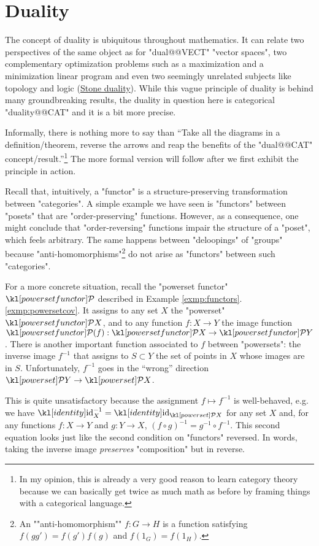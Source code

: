 \documentclass[main.tex]{subfiles}
\begin{document}
\chapter{Duality}\label{chap:duality}
The concept of duality is ubiquitous throughout mathematics. It can relate two perspectives of the same object as for "dual@@VECT" "vector spaces", two complementary optimization problems such as a maximization and a minimization linear program and even two seemingly unrelated subjects like topology and logic (\href{https://en.wikipedia.org/wiki/Stone_duality}{Stone duality}). While this vague principle of duality is behind many groundbreaking results, the duality in question here is categorical "duality@@CAT" and it is a bit more precise.%

Informally, there is nothing more to say than ``Take all the diagrams in a definition/theorem, reverse the arrows and reap the benefits of the "dual@@CAT" concept/result.''\footnote{In my opinion, this is already a very good reason to learn category theory because we can basically get twice as much math as before by framing things with a categorical language.} The more formal version will follow after we first exhibit the principle in action.

Recall that, intuitively, a "functor" is a structure-preserving transformation between "categories". A simple example we have seen is "functors" between "posets" that are "order-preserving" functions. However, as a consequence, one might conclude that "order-reversing" functions impair the structure of a "poset", which feels arbitrary. The same happens between "deloopings" of "groups" because "anti-homomorphisms"\footnote{\AP An ""anti-homomorphism"" $f: G \rightarrow H$ is a function satisfying $f(gg') = f(g')f(g)$ and $f(1_G) = f(1_H)$.} do not arise as "functors" between such "categories".

For a more concrete situation, recall the "powerset functor" $\mPcov$ described in Example \ref{exmp:functors}.\ref{exmp:powersetcov}. It assigns to any set $X$ the "powerset" $\mPcov X$, and to any function $f: X \rightarrow Y$ the image function $\mPcov(f): \mPcov X \rightarrow \mPcov Y$. There is another important function associated to $f$ between "powersets": the inverse image $f^{-1}$ that assigns to $S \subset Y$ the set of points in $X$ whose images are in $S$. Unfortunately, $f^{-1}$ goes in the ``wrong'' direction $\mP Y \rightarrow \mP X$.

This is quite unsatisfactory because the assignment $f \mapsto f^{-1}$ is well-behaved, e.g. we have $\id_X^{-1} = \id_{\mP X}$ for any set $X$ and, for any functions $f: X \rightarrow Y$ and $g: Y \rightarrow X$, $(f \circ g)^{-1} = g^{-1} \circ f^{-1}$. This second equation looks just like the second condition on "functors" reversed. In words, taking the inverse image \textit{preserves} "composition" but in reverse.
\end{document}
